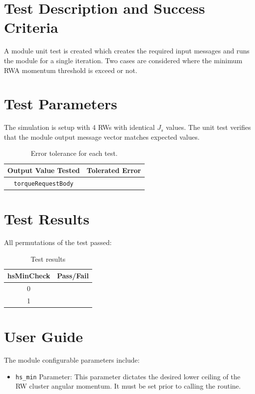 \documentclass[]{BasiliskReportMemo}
\begin{document}
\section{Test Description and Success Criteria}
A module unit test is created which creates the required input messages and runs the module for a single iteration.  Two cases are considered where the minimum RWA momentum threshold is exceed or not.




\section{Test Parameters}
The simulation is setup with 4  RWs with identical $J_{s}$ values.
The unit test verifies that the module output  message vector matches expected values.
\begin{table}[htbp]
	\caption{Error tolerance for each test.}
	\label{tab:errortol}
	\centering \fontsize{10}{10}\selectfont
	\begin{tabular}{ c | c } %
		\hline\hline
		\textbf{Output Value Tested}  & \textbf{Tolerated Error}  \\
		\hline
		{\tt torqueRequestBody}        & 	   \\
		\hline\hline
	\end{tabular}
\end{table}




\section{Test Results}
All permutations of the test passed:
\begin{table}[h]
	\caption{Test results}
	\label{tab:results}
	\centering \fontsize{10}{10}\selectfont
	\begin{tabular}{c | c  } %
		\hline\hline
		\textbf{hsMinCheck} 	&\textbf{Pass/Fail} \\
		\hline
	   0	   			&  \\
	   1 	   			&  \\
	   \hline\hline
	\end{tabular}
\end{table}












\section{User Guide}
The module configurable parameters include:
\begin{itemize}
	\item {{\tt hs\_min} Parameter}:
This parameter dictates the desired lower ceiling of the RW cluster angular momentum.  It must be set prior to calling the routine.
\end{itemize}
\end{document}
